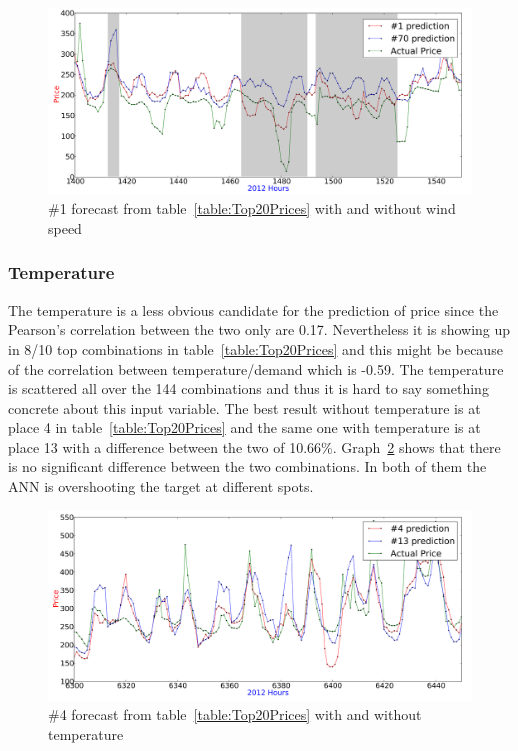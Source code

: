 \begin{figure}[H]
\centering
\includegraphics[width=\linewidth]{billeder/PriceExperimentalAnalysis/X1_windspeed_vs_no_windspeed.png}
\caption{\#1 forecast from table~\ref{table:Top20Prices} with and without wind speed}
\label{fig:Windspeed_no_windspeed}
\end{figure}

\subsubsection{Temperature}
The temperature is a less obvious candidate for the prediction of price since the Pearson's correlation between the two only are 0.17. Nevertheless it is showing up in 8/10 top combinations in table~\ref{table:Top20Prices} and this might be because of the correlation between temperature/demand which is -0.59. The temperature is scattered all over the 144 combinations and thus it is hard to say something concrete about this input variable. The best result without temperature is at place 4 in table~\ref{table:Top20Prices} and the same one with temperature is at place 13 with a difference between the two of 10.66\%. Graph~\ref{fig:temperature_comparison} shows that there is no significant difference between the two combinations. In both of them the ANN is overshooting the target at different spots.

\begin{figure}[H]
\centering
\includegraphics[width=\linewidth]{billeder/PriceExperimentalAnalysis/temperatureComparison.png}
\caption{\#4 forecast from table~\ref{table:Top20Prices} with and without temperature}
\label{fig:temperature_comparison}
\end{figure}

